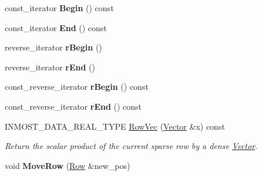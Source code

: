 \begin{DoxyCompactItemize}
\item 
\hypertarget{classINMOST_1_1Solver_1_1Row_a8944846feb4a1d33df5ac39d0d84929f}{const\-\_\-iterator {\bfseries Begin} () const }\label{classINMOST_1_1Solver_1_1Row_a8944846feb4a1d33df5ac39d0d84929f}

\item 
\hypertarget{classINMOST_1_1Solver_1_1Row_a8ad80117dea23ed625e13d88fff017c0}{const\-\_\-iterator {\bfseries End} () const }\label{classINMOST_1_1Solver_1_1Row_a8ad80117dea23ed625e13d88fff017c0}

\item 
\hypertarget{classINMOST_1_1Solver_1_1Row_a144833591962eda366d902a1bbc5859c}{reverse\-\_\-iterator {\bfseries r\-Begin} ()}\label{classINMOST_1_1Solver_1_1Row_a144833591962eda366d902a1bbc5859c}

\item 
\hypertarget{classINMOST_1_1Solver_1_1Row_ae6029686b9d4203f940fbc25105abda2}{reverse\-\_\-iterator {\bfseries r\-End} ()}\label{classINMOST_1_1Solver_1_1Row_ae6029686b9d4203f940fbc25105abda2}

\item 
\hypertarget{classINMOST_1_1Solver_1_1Row_a5d3967eb389061b8efed504154814f36}{const\-\_\-reverse\-\_\-iterator {\bfseries r\-Begin} () const }\label{classINMOST_1_1Solver_1_1Row_a5d3967eb389061b8efed504154814f36}

\item 
\hypertarget{classINMOST_1_1Solver_1_1Row_a10a4f2916edf251ee04cea7c1f6502b7}{const\-\_\-reverse\-\_\-iterator {\bfseries r\-End} () const }\label{classINMOST_1_1Solver_1_1Row_a10a4f2916edf251ee04cea7c1f6502b7}

\item 
\hypertarget{classINMOST_1_1Solver_1_1Row_ac9cbd7928544cfffe5e8ad8ccea269cb}{I\-N\-M\-O\-S\-T\-\_\-\-D\-A\-T\-A\-\_\-\-R\-E\-A\-L\-\_\-\-T\-Y\-P\-E \hyperlink{classINMOST_1_1Solver_1_1Row_ac9cbd7928544cfffe5e8ad8ccea269cb}{Row\-Vec} (\hyperlink{classINMOST_1_1Solver_1_1Vector}{Vector} \&x) const }\label{classINMOST_1_1Solver_1_1Row_ac9cbd7928544cfffe5e8ad8ccea269cb}

\begin{DoxyCompactList}\small\item\em Return the scalar product of the current sparse row by a dense \hyperlink{classINMOST_1_1Solver_1_1Vector}{Vector}. \end{DoxyCompactList}\item 
\hypertarget{classINMOST_1_1Solver_1_1Row_a67f9cbe973e71fa8b9ba1dc92256b75a}{void {\bfseries Move\-Row} (\hyperlink{classINMOST_1_1Solver_1_1Row}{Row} \&new\-\_\-pos)}\label{classINMOST_1_1Solver_1_1Row_a67f9cbe973e71fa8b9ba1dc92256b75a}


\end{DoxyCompactItemize}
